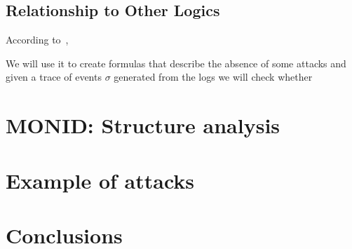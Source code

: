 \documentclass[english]{article}
\begin{document}
\subsection{Relationship to Other Logics}
According to~\cite{barringer2004rule},

We will use it to create formulas that describe the absence of some attacks and given a trace of events $\sigma$ generated from the logs we will check whether 

\section{MONID: Structure analysis}

\section{Example of attacks}

\section{Conclusions}

\printbibliography
\end{document}
